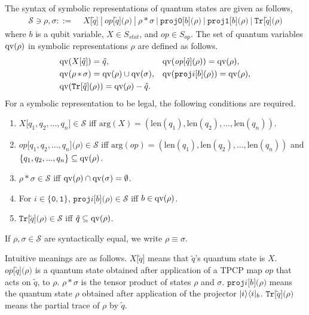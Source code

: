 \begin{defi}
\label{symqccs:symbrep}
The syntax of symbolic representations of quantum states 
are given as  follows,
\begin{align*}
\mathcal{S} \ni \rho, \sigma ::=\,\, &X\mathtt{[}\tilde q\mathtt{]} ~|~
\mathit{op}\mathtt{[}\tilde q\mathtt{](}\rho\mathtt{)} ~|~ \rho \,
  \mathtt{*} \, \sigma
  ~|~\mathtt{proj0}\mathtt{[}b\mathtt{](}\rho\mathtt{)}
~|~\mathtt{proj1}\mathtt{[}b\mathtt{](}\rho\mathtt{)}
~|~\mathtt{Tr}\mathtt{[}\tilde q\mathtt{](}\rho\mathtt{)}
\end{align*}
where $b$ is a qubit variable, $X \in S_{\mathit{stat}}$, and 
$\mathit{op} \in S_{\mathit{op}}$. The set of quantum variables 
$\mathrm{qv}(\rho)$ in symbolic representations $\rho$ are defined as follows.
\begin{align*}
&\mathrm{qv}(X\mathtt{[}\tilde q\mathtt{]}) = \tilde q,
&&\mathrm{qv}(\mathit{op}\mathtt{[}\tilde
 q\mathtt{](}\rho\mathtt{)})=\mathrm{qv}(\rho),\\
&\mathrm{qv}(\rho \,\mathtt{*}\, \sigma) = 
 \mathrm{qv}(\rho) \cup \mathrm{qv}(\sigma),
&&\mathrm{qv}(\mathtt{proj}i\mathtt{[}b\mathtt{](}\rho\mathtt{)})
= \mathrm{qv}(\rho),\\
&\mathrm{qv}(\mathtt{Tr}\mathtt{[}\tilde
 q\mathtt{](}\rho\mathtt{)})=\mathrm{qv}(\rho) - \tilde q.
\end{align*}
For a symbolic representation to be legal, the following conditions are
required.
\begin{enumerate}
 \item $X\mathtt{[}q_1,q_2,...,q_n\mathtt{]} \in \mathcal{S}$ iff 
       $\mathrm{arg}(X)=(\mathrm{len}(q_1),\mathrm{len}(q_2),...,\mathrm{len}(q_
       n))$.
 \item $\mathit{op}\mathtt{[}q_1,q_2,...,q_n\mathtt{](}\rho\mathtt{)}
       \in \mathcal{S}$ iff
       $\mathrm{arg}(op)=(\mathrm{len}(q_1),\mathrm{len}(q_2),...,
       \mathrm{len}(q_n))$ and \\
       $\{q_1,q_2,...,q_n\} \subseteq \mathrm{qv}(\rho)$.
 \item $\rho \, \mathtt{*} \, \sigma \in \mathcal{S}$ iff $\mathrm{qv}(\rho) \cap
       \mathrm{qv}(\sigma) = \emptyset$.
 \item For $i \in \{\mathtt{0}, \mathtt{1}\}$,
       $\mathtt{proj}i\mathtt{[}b\mathtt{](}\rho\mathtt{)} \in \mathcal{S}$ 
       iff $b \in \mathrm{qv}(\rho)$.
 \item $\mathtt{Tr}\mathtt{[}\tilde q \mathtt{](}\rho\mathtt{)} \in
       \mathcal{S}$ iff $\tilde q \subseteq \mathrm{qv}(\rho)$.
\end{enumerate}
If $\rho, \sigma \in \mathcal{S}$ are syntactically equal, we write
 $\rho \equiv \sigma$.
\end{defi}
Intuitive meanings are as follows.
$X\texttt{[}\tilde q\texttt{]}$ means that $\tilde q$'s quantum state
is $X$.
$\mathit{op}\texttt{[}\tilde q\texttt{](}\rho\texttt{)}$
is a quantum state obtained after application of a TPCP map
$\mathit{op}$ that
acts on $\tilde q$, 
to $\rho$.  $\rho \,  \mathtt{*} \, \sigma$ is the tensor product of
states $\rho$ and $\sigma$. $\mathtt{proj}i\texttt{[}b\texttt{](}\rho\texttt{)}$
means the quantum state $\rho$ obtained after application of the projector
$|i\rangle\langle i|_b$. $\mathtt{Tr}\texttt{[}\tilde
q\texttt{](}\rho\texttt{)}$ means the partial trace of $\rho$ by
$\tilde q$.

